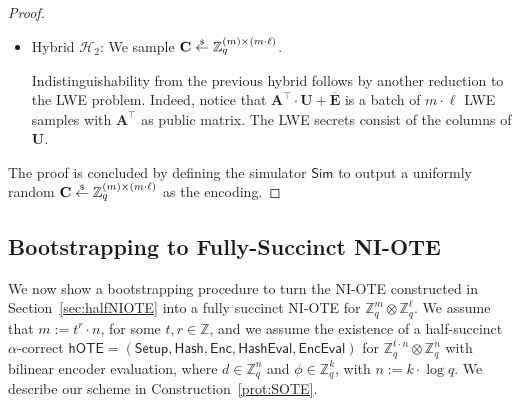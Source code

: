 \documentclass{theoretics}
\newcommand{\getsr}{\overset{\raisebox{-1pt}{$\scriptscriptstyle \$$}}{\gets}}
\newcommand{\sample}{\getsr}
\newcommand{\BOTE}{\mathsf{hOTE}}
\newcommand{\Z}{\mathbb{Z}}
\newcommand{\Sim}{\mathsf{Sim}}
\newcommand{\algofont}[1]{\ensuremath{\mathsf{#1}}}
\newcommand{\Enc}{{\algofont{Enc}}}
\newcommand{\Setup}{{\algofont{Setup}}}
\newcommand{\Eval}{\algofont{Eval}\xspace}
\newcommand{\Hash}{{\algofont{Hash}}}
\begin{document}
\begin{proof}
\begin{itemize}
        \item Hybrid $\mathcal{H}_2$: We sample $\mathbf{C}\sample\Z_q^{(m)\times (m\cdot \ell)}$.

        Indistinguishability from the previous hybrid follows by another reduction to the LWE problem. Indeed, notice that $\mathbf{A}^\intercal\cdot \mathbf{U}+\overline{\mathbf{E}}$ is a batch of $m\cdot \ell$ LWE samples with $\mathbf{A}^\intercal$ as public matrix. The LWE secrets consist of the columns of $\mathbf{U}$.
    \end{itemize}
    The proof is concluded by defining the simulator $\Sim$ to output a uniformly random $\mathbf{C}\sample\Z_q^{(m)\times (m\cdot \ell)}$ as the encoding.
\end{proof}







\subsection{Bootstrapping to Fully-Succinct NI-OTE}\label{sec:NIOTE}

We now show a bootstrapping procedure to turn the NI-OTE constructed in Section~\ref{sec:halfNIOTE} into a fully succinct NI-OTE for $\Z_q^{m} \otimes \Z_q^\ell$. We assume that $m := t^r \cdot n$, for some $t,r\in \Z$, and we assume the existence of a half-succinct $\alpha$-correct $\BOTE=(\Setup, \allowbreak \Hash, \allowbreak \Enc, \allowbreak \Hash\Eval, \allowbreak \Enc\Eval)$ for  $\Z_q^{t\cdot n}\otimes \Z_q^n$ with bilinear encoder evaluation, where $d \in \Z_q^n$ and $\phi \in \Z_q^k$, with $n:= k \cdot \log q$. We describe our scheme in Construction~\ref{prot:SOTE}.
\end{document}
